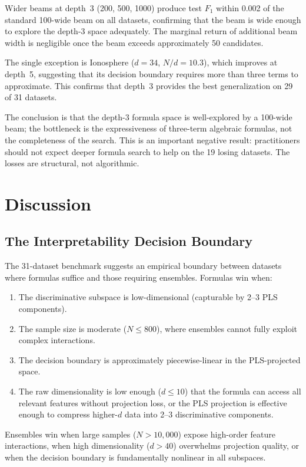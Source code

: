 \documentclass[journal]{IEEEtran}
\begin{document}
Wider beams at depth~3 (200, 500, 1000) produce test $F_1$ within
0.002 of the standard 100-wide beam on all datasets, confirming
that the beam is wide enough to explore the depth-3 space
adequately.  The marginal return of additional beam width is
negligible once the beam exceeds approximately 50 candidates.

The single exception is Ionosphere ($d = 34$, $N/d = 10.3$), which
improves at depth~5, suggesting that its decision boundary requires
more than three terms to approximate.  This confirms that depth~3
provides the best generalization on 29 of 31 datasets.

The conclusion is that the depth-3 formula space is well-explored
by a 100-wide beam; the bottleneck is the expressiveness of
three-term algebraic formulas, not the completeness of the search.
This is an important negative result: practitioners should not
expect deeper formula search to help on the 19 losing datasets.
The losses are structural, not algorithmic.

\section{Discussion}

\subsection{The Interpretability Decision Boundary}
\label{sec:boundary}

The 31-dataset benchmark suggests an empirical boundary between
datasets where formulas suffice and those requiring ensembles.
Formulas win when:
\begin{enumerate}
\item The discriminative subspace is low-dimensional (capturable by
2--3 PLS components).
\item The sample size is moderate ($N \leq 800$), where ensembles
cannot fully exploit complex interactions.
\item The decision boundary is approximately piecewise-linear in the
PLS-projected space.
\item The raw dimensionality is low enough ($d \leq 10$) that the
formula can access all relevant features without projection loss,
or the PLS projection is effective enough to compress higher-$d$
data into 2--3 discriminative components.
\end{enumerate}
Ensembles win when large samples ($N > 10{,}000$) expose high-order
feature interactions, when high dimensionality ($d > 40$) overwhelms
projection quality, or when the decision boundary is fundamentally
nonlinear in all subspaces.
\end{document}
